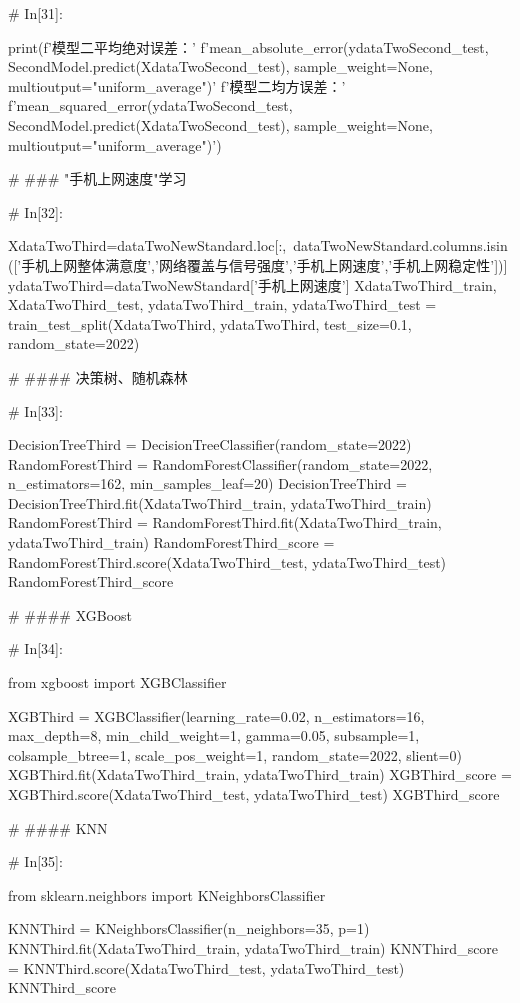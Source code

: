 \documentclass{MathorCupmodeling}
\begin{document}
\begin{python}
# In[31]:


print(f'模型二平均绝对误差：'
      f'{mean_absolute_error(ydataTwoSecond_test, SecondModel.predict(XdataTwoSecond_test), sample_weight=None, multioutput="uniform_average")}\n'
      f'模型二均方误差：'
      f'{mean_squared_error(ydataTwoSecond_test, SecondModel.predict(XdataTwoSecond_test), sample_weight=None, multioutput="uniform_average")}')


# ### "手机上网速度"学习

# In[32]:


XdataTwoThird=dataTwoNewStandard.loc[:,~dataTwoNewStandard.columns.isin(['手机上网整体满意度','网络覆盖与信号强度','手机上网速度','手机上网稳定性'])]
ydataTwoThird=dataTwoNewStandard['手机上网速度']
XdataTwoThird_train, XdataTwoThird_test, ydataTwoThird_train, ydataTwoThird_test = train_test_split(XdataTwoThird, ydataTwoThird, test_size=0.1, random_state=2022)


# #### 决策树、随机森林

# In[33]:


DecisionTreeThird = DecisionTreeClassifier(random_state=2022)
RandomForestThird = RandomForestClassifier(random_state=2022, n_estimators=162, min_samples_leaf=20)
DecisionTreeThird = DecisionTreeThird.fit(XdataTwoThird_train, ydataTwoThird_train)
RandomForestThird = RandomForestThird.fit(XdataTwoThird_train, ydataTwoThird_train)
RandomForestThird_score = RandomForestThird.score(XdataTwoThird_test, ydataTwoThird_test)
RandomForestThird_score


# #### XGBoost

# In[34]:


from xgboost import XGBClassifier

XGBThird = XGBClassifier(learning_rate=0.02,
                         n_estimators=16,
                         max_depth=8,
                         min_child_weight=1,
                         gamma=0.05,
                         subsample=1,
                         colsample_btree=1,
                         scale_pos_weight=1,
                         random_state=2022,
                         slient=0)
XGBThird.fit(XdataTwoThird_train, ydataTwoThird_train)
XGBThird_score = XGBThird.score(XdataTwoThird_test, ydataTwoThird_test)
XGBThird_score


# #### KNN

# In[35]:


from sklearn.neighbors import KNeighborsClassifier

KNNThird = KNeighborsClassifier(n_neighbors=35, p=1)
KNNThird.fit(XdataTwoThird_train, ydataTwoThird_train)
KNNThird_score = KNNThird.score(XdataTwoThird_test, ydataTwoThird_test)
KNNThird_score



\end{python}
\end{document}
